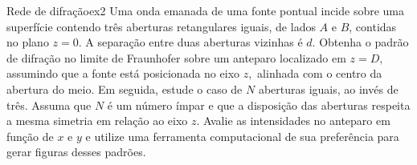 \begin{exercício}{Rede de difração}{ex2}
    Uma onda emanada de uma fonte pontual incide sobre uma superfície contendo três aberturas retangulares iguais, de lados \(A\) e \(B\), contidas no plano \(z = 0\). A separação entre duas aberturas vizinhas é \(d\). Obtenha o padrão de difração no limite de Fraunhofer sobre um anteparo localizado em \(z = D,\) assumindo que a fonte está posicionada no eixo \(z,\) alinhada com o centro da abertura do meio. Em seguida, estude o caso de \(N\) aberturas iguais, ao invés de três. Assuma que \(N\) é um número ímpar e que a disposição das aberturas respeita a mesma simetria em relação ao eixo \(z\). Avalie as intensidades no anteparo em função de \(x\) e \(y\) e utilize uma ferramenta computacional de sua preferência para gerar figuras desses padrões.
\end{exercício}
